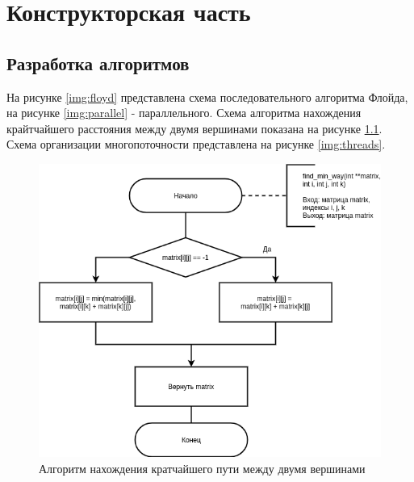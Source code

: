 \chapter{Конструкторская часть}

\section{Разработка алгоритмов}

На рисунке \ref{img:floyd} представлена схема последовательного алгоритма Флойда, на рисунке \ref{img:parallel} - параллельного. Схема алгоритма нахождения крайтчайшего расстояния между двумя вершинами показана на рисунке \ref{img:min}. Схема организации многопоточности представлена на рисунке \ref{img:threads}.

\begin{figure}[H]
	\begin{center}
		\includegraphics[scale=0.6]{images/min.png}
	\end{center}
	\captionsetup{justification=centering}
	\caption{Алгоритм нахождения кратчайшего пути между двумя вершинами}
	\label{img:min}
\end{figure}

